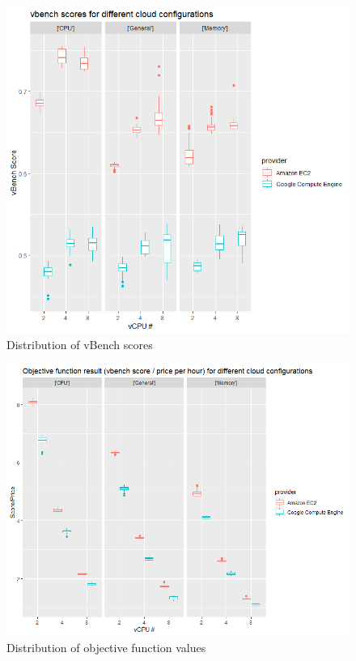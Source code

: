 \documentclass{article}
\begin{document}
\begin{figure}
  \caption{Distribution of vBench scores}
  \centering
   \includegraphics[scale=0.8]{vbench_scores}
\end{figure}
\begin{figure}
  \caption{Distribution of objective function values}
  \centering
   \includegraphics[scale=0.8]{vbench_values}
\end{figure}
\end{document}
